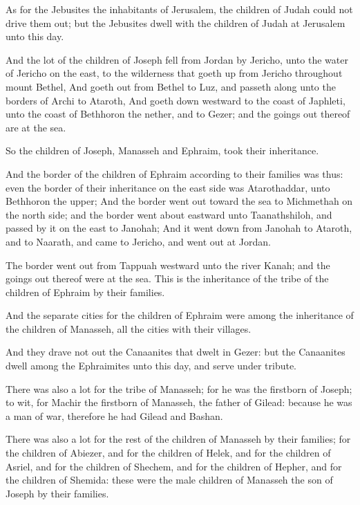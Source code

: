 \Verse As for the Jebusites the inhabitants of Jerusalem, the children of Judah could not drive them out; but the Jebusites dwell with the children of Judah at Jerusalem unto this day.


\Chapter
\Verse And the lot of the children of Joseph fell from Jordan by Jericho, unto the water of Jericho on the east, to the wilderness that goeth up from Jericho throughout mount Bethel, \Verse And goeth out from Bethel to Luz, and passeth along unto the borders of Archi to Ataroth, \Verse And goeth down westward to the coast of Japhleti, unto the coast of Bethhoron the nether, and to Gezer; and the goings out thereof are at the sea.

\Verse So the children of Joseph, Manasseh and Ephraim, took their inheritance.

\Verse And the border of the children of Ephraim according to their families was thus: even the border of their inheritance on the east side was Atarothaddar, unto Bethhoron the upper; \Verse And the border went out toward the sea to Michmethah on the north side; and the border went about eastward unto Taanathshiloh, and passed by it on the east to Janohah; \Verse And it went down from Janohah to Ataroth, and to Naarath, and came to Jericho, and went out at Jordan.

\Verse The border went out from Tappuah westward unto the river Kanah; and the goings out thereof were at the sea. This is the inheritance of the tribe of the children of Ephraim by their families.

\Verse And the separate cities for the children of Ephraim were among the inheritance of the children of Manasseh, all the cities with their villages.

\Verse And they drave not out the Canaanites that dwelt in Gezer: but the Canaanites dwell among the Ephraimites unto this day, and serve under tribute.


\Chapter
\Verse There was also a lot for the tribe of Manasseh; for he was the firstborn of Joseph; to wit, for Machir the firstborn of Manasseh, the father of Gilead: because he was a man of war, therefore he had Gilead and Bashan.

\Verse There was also a lot for the rest of the children of Manasseh by their families; for the children of Abiezer, and for the children of Helek, and for the children of Asriel, and for the children of Shechem, and for the children of Hepher, and for the children of Shemida: these were the male children of Manasseh the son of Joseph by their families.

